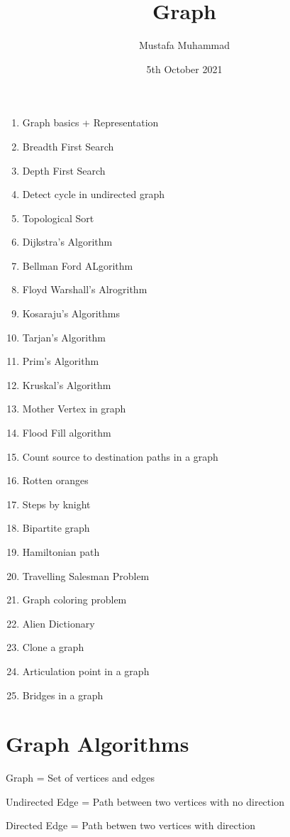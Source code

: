 \documentclass[24pt, a4]{article}
\title{Graph}
\author{Mustafa Muhammad}
\date{5th October 2021}
\begin{document}
\maketitle
\newpage
\begin{enumerate}
    \item{Graph basics + Representation}
    \item{Breadth First Search}
    \item{Depth First Search}
    \item{Detect cycle in undirected graph}
    \item{Topological Sort}
    \item{Dijkstra's Algorithm}
    \item{Bellman Ford ALgorithm}
    \item{Floyd Warshall's Alrogrithm}
    \item{Kosaraju's Algorithms}
    \item{Tarjan's Algorithm}
    \item{Prim's Algorithm}
    \item{Kruskal's Algorithm}
    \item{Mother Vertex in graph}
    \item{Flood Fill algorithm}
    \item{Count source to destination paths in a graph}
    \item{Rotten oranges}
    \item{Steps by knight}
    \item{Bipartite graph}
    \item{Hamiltonian path}
    \item{Travelling Salesman Problem}
    \item{Graph coloring problem}
    \item{Alien Dictionary}
    \item{Clone a graph}
    \item{Articulation point in a graph}
    \item{Bridges in a graph}
\end{enumerate}

\section{Graph Algorithms}
Graph = Set of vertices and edges

Undirected Edge = Path between two vertices with no direction

Directed Edge = Path betwen two vertices with direction
\end{document}
